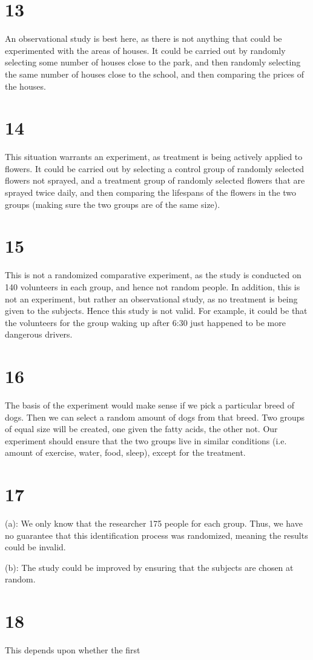 \documentclass{article}
\theoremstyle{definition}
\newcommand{\?}{\stackrel{?}{=}}
\begin{document}
\section*{13}
An observational study is best here, as there is not anything that could be experimented with the areas of houses. 
It could be carried out by randomly selecting some number of houses close to the park, and then randomly selecting the same number of 
houses close to the school, and then comparing the prices of the houses.

\section*{14}
This situation warrants an experiment, as treatment is being actively applied to flowers. 
It could be carried out by selecting a control group of randomly selected flowers not sprayed, and a treatment group of randomly 
selected flowers that are sprayed twice daily, and then comparing the lifespans of the flowers in the two groups (making sure the two groups are of the same size).

\section*{15}
This is not a randomized comparative experiment, as the study is conducted on 140 volunteers in each group, and hence not random people. In addition, this is not an 
experiment, but rather an observational study, as no treatment is being given to the subjects. 
Hence this study is not valid. For example, it could be that the volunteers for the group waking up after 6:30 just happened to be more dangerous drivers. 

\section*{16}
The basis of the experiment would make sense if we pick a particular breed of dogs. Then we can select a random amount of dogs from that breed. Two groups of equal size will be 
created, one given the fatty acids, the other not. Our experiment should ensure that the two groups 
live in similar conditions (i.e. amount of exercise, water, food, sleep), except for the treatment.

\section*{17}
(a): We only know that the researcher  175 people for each group. Thus, we have no guarantee that this identification process was randomized, meaning 
the results could be invalid.


(b): The study could be improved by ensuring that the subjects are chosen at random.

\section*{18}
This depends upon whether the first
\end{document}
